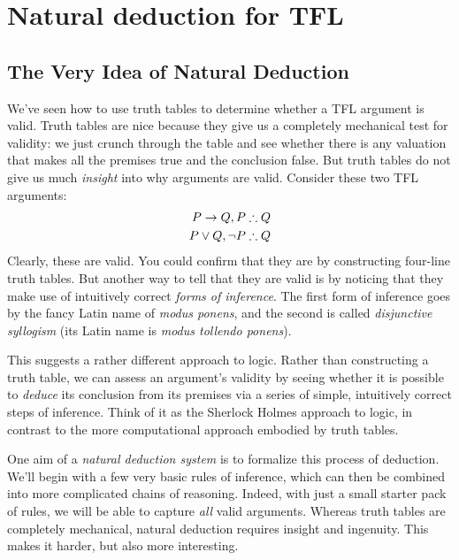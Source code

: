 \chapter{Natural deduction for TFL}\label{ch:NDTFL}

\section{The Very Idea of Natural Deduction}\label{s:NDVeryIdea}


We've seen how to use truth tables to determine whether a TFL argument is valid.  Truth tables are nice because they give us a completely mechanical test for validity: we just crunch through the table and see whether there is any valuation that makes all the premises true and the conclusion false.   But truth tables do not give us much \emph{insight} into why arguments are valid. Consider these two TFL arguments:
\begin{align*}
P \rightarrow Q, P & \therefore Q\\
P \vee Q, \neg P & \therefore Q
\end{align*}
Clearly, these are valid. You could confirm that they are by constructing four-line truth tables. But another way to tell that they are valid is by noticing that they make use of intuitively correct \emph{forms of inference}.  The first form of inference goes by the fancy Latin name of \emph{modus ponens}, and the second is called \emph{disjunctive syllogism} (its Latin name is \emph{modus tollendo ponens}). 

This suggests a rather different approach to logic.  Rather than constructing a truth table, we can assess an argument's validity by seeing whether it is possible to \emph{deduce} its conclusion from its premises via a series of simple, intuitively correct  steps of inference.  Think of it as the Sherlock Holmes approach to logic, in contrast to the more computational approach embodied by truth tables.

One aim of a \emph{natural deduction system} is to formalize this process of deduction. We'll begin with a few very basic rules of inference, which can then be combined into more complicated chains of reasoning. Indeed, with just a small starter pack of rules, we will be able to capture \emph{all} valid arguments.   Whereas truth tables are completely mechanical, natural deduction requires insight and ingenuity.  This makes it harder, but also more interesting.

